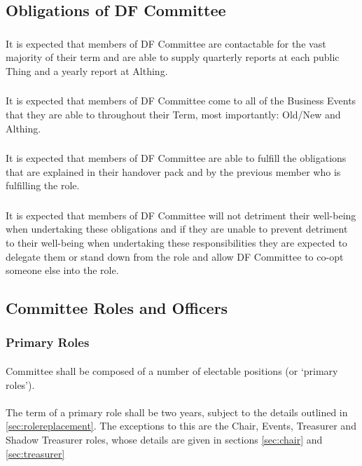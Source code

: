 \documentclass[a4paper, 11pt]{report}
\begin{document}
\subsection{Obligations of DF Committee}
\label{sec:ctteobligations}
\subsubsection{}
It is expected that members of DF Committee are contactable for the vast majority of their term and are able to supply quarterly reports at each public Thing and a yearly report at Althing.
\subsubsection{}
It is expected that members of DF Committee come to all of the Business Events that they are able to throughout their Term, most importantly: Old/New and Althing.
\subsubsection{}
It is expected that members of DF Committee are able to fulfill the obligations that are explained in their handover pack and by the previous member who is fulfilling the role.
\subsubsection{}
It is expected that members of DF Committee will not detriment their well-being when undertaking these obligations and if they are unable to prevent detriment to their well-being when undertaking these responsibilities they are expected to delegate them or stand down from the role and allow DF Committee to co-opt someone else into the role.

\subsection{Committee Roles and Officers}
\subsubsection{Primary Roles}
\label{sec:primaryroles}
\paragraph{} Committee shall be composed of a number of electable positions (or ‘primary roles’).

\paragraph{} The term of a primary role shall be two years, subject to the details outlined in \ref{sec:rolereplacement}.  The exceptions to this are the Chair, Events, Treasurer and Shadow Treasurer roles, whose details are given in sections \ref{sec:chair} and \ref{sec:treasurer}
\end{document}
